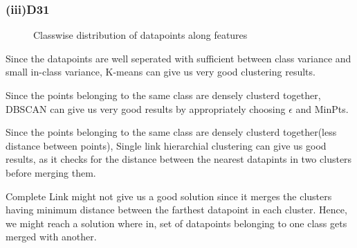 \documentclass[paper=a4, fontsize=11pt]{scrartcl}
\numberwithin{equation}{section}		%
\numberwithin{figure}{section}			%
\numberwithin{table}{section}				%
\begin{document}
\subsubsection*{(iii)D31}
\begin{figure}[H]
  \centering
  \hfill
  \caption*{Classwise distribution of datapoints along features}
\end{figure}

Since the datapoints are well seperated with sufficient between class variance and small in-class variance, K-means can give us very good clustering results.

Since the points belonging to the same class are densely clusterd together, DBSCAN can give us very good results by appropriately choosing $\epsilon$ and MinPts.

Since the points belonging to the same class are densely clusterd together(less distance between points), Single link hierarchial clustering can give us good results, as it checks for the distance between the nearest datapints in two clusters before merging them.

Complete Link might not give us a good solution since it merges the clusters having minimum distance between the farthest datapoint in each cluster. Hence, we might reach a solution where in, set of datapoints belonging to one class gets merged with another.
\end{document}
